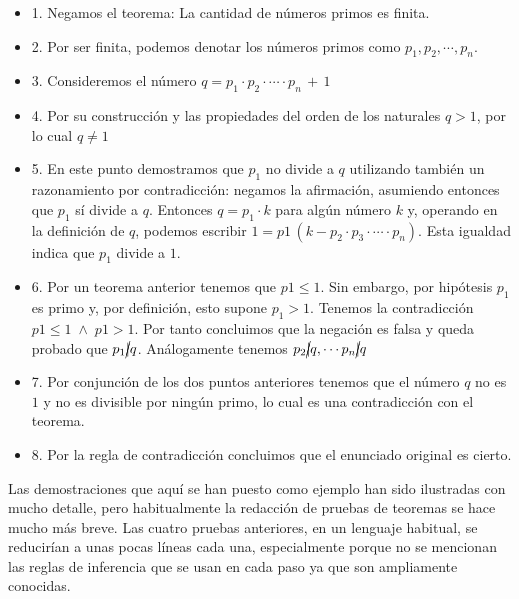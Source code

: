 \begin{itemize}
	
\item 1. Negamos el teorema: La cantidad de números primos es finita. 

\item 2. Por ser finita, podemos denotar los números primos como $p_1, p_2, \cdots, p_n$. 

\item 3. Consideremos el número $q = p_1 \cdot  p_2 \cdot  \cdots \cdot  p_n \, + \, 1$ 

\item 4. Por su construcción y las propiedades del orden de los naturales $q > 1$, por lo cual $q \neq 1$ 

\item 5. En este punto demostramos que $p_1$ no divide a $q$ utilizando también un razonamiento por contradicción: negamos la afirmación, asumiendo entonces que $p_1$ sí divide a $q$. Entonces $q = p_1\cdot k$ para algún número $k$ y, operando en la definición de $q$, podemos escribir $1 = p1\,(k - p_2 \cdot p_3 \cdot \cdots \cdot  p_n)$. Esta igualdad indica que $p_1$ divide a $1$. 

\item 6. Por un teorema anterior tenemos que $p1 \le 1$. Sin embargo, por hipótesis $p_1$ es primo y, por  definición, esto supone $p_1 > 1$. Tenemos la contradicción $p1 \le 1 \; \wedge \;  p1 > 1$. Por tanto concluimos que la negación es falsa y queda probado que $p_1 \cancel{|}q$. Análogamente tenemos $p_2 \cancel{|}q, \cdots  p_n \cancel{|}q$ 

\item 7. Por conjunción de los dos puntos anteriores tenemos que el número $q$ no es $1$ y no es divisible por ningún primo, lo cual es una contradicción con el teorema.

\item 8. Por la regla de contradicción concluimos que el enunciado original es cierto.
\end{itemize}
\rightline{$\Box$}

Las demostraciones que aquí se han puesto como ejemplo han sido ilustradas con mucho detalle, pero habitualmente la redacción de pruebas de teoremas se hace mucho más breve. Las cuatro pruebas anteriores, en un lenguaje habitual, se reducirían a unas pocas líneas cada una, especialmente porque no se mencionan las reglas de inferencia que se usan en cada paso ya que son ampliamente conocidas.



